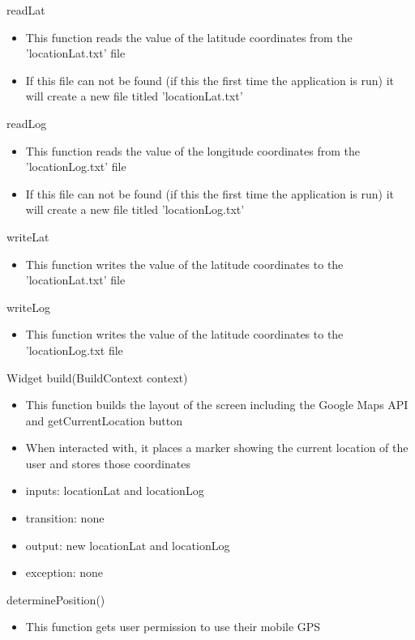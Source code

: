 \documentclass[12pt, titlepage]{article}
\begin{document}
\noindent readLat
\begin{itemize}
\item This function reads the value of the latitude coordinates from the 'locationLat.txt' file
\item If this file can not be found (if this the first time the application is run) it will create a new file titled 'locationLat.txt'
\end{itemize}

\noindent readLog
\begin{itemize}
\item This function reads the value of the longitude coordinates from the 'locationLog.txt' file
\item If this file can not be found (if this the first time the application is run) it will create a new file titled 'locationLog.txt'
\end{itemize}

\noindent writeLat
\begin{itemize}
\item This function writes the value of the latitude coordinates to the 'locationLat.txt' file
\end{itemize}

\noindent writeLog
\begin{itemize}
\item This function writes the value of the latitude coordinates to the 'locationLog.txt file
\end{itemize}

\noindent Widget build(BuildContext context)
\begin{itemize}
\item This function builds the layout of the screen including the Google Maps API and getCurrentLocation button
\item When interacted with, it places a marker showing the current location of the user and stores those coordinates
\end{itemize}

\begin{itemize}
\item inputs: locationLat and locationLog
\item transition: none
\item output: new locationLat and locationLog
\item exception: none
\end{itemize}

\noindent determinePosition()
\begin{itemize}
\item This function gets user permission to use their mobile GPS
\end{itemize}
\end{document}
